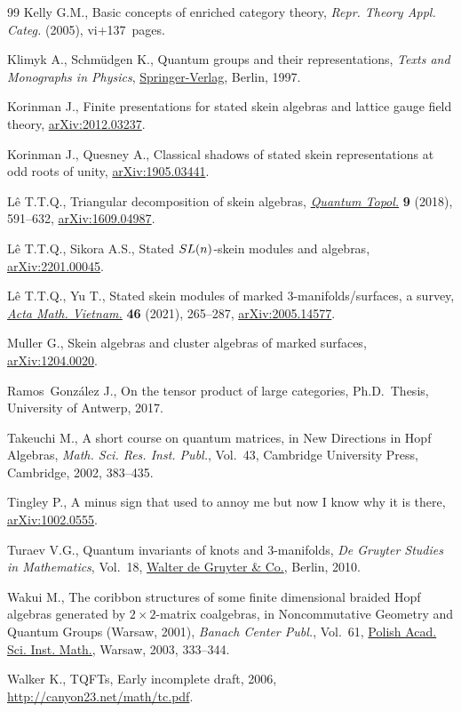 \documentclass[11pt]{article}
\numberwithin{equation}{section}
\numberwithin{equation}{section}
\begin{document}
\begin{thebibliography}{99}
Kelly G.M., Basic concepts of enriched category theory, \textit{Repr. Theory
 Appl. Categ.} (2005), vi+137~pages.

Klimyk A., Schm\"udgen K., Quantum groups and their representations, \textit{Texts and
 Monographs in Physics}, \href{https://doi.org/10.1007/978-3-642-60896-4}{Springer-Verlag}, Berlin, 1997.

Korinman J., Finite presentations for stated skein algebras and lattice gauge
 field theory, \href{http://arxiv.org/abs/2012.03237}{arXiv:2012.03237}.

Korinman J., Quesney A., Classical shadows of stated skein representations at
 odd roots of unity, \href{http://arxiv.org/abs/1905.03441}{arXiv:1905.03441}.

L\^e T.T.Q., Triangular decomposition of skein algebras, \href{https://doi.org/10.4171/QT/115}{\textit{Quantum
 Topol.}} \textbf{9} (2018), 591--632, \href{http://arxiv.org/abs/1609.04987}{arXiv:1609.04987}.

L\^e T.T.Q., Sikora A.S., Stated ${\rm SL}(n)$-skein modules and algebras,
 \href{http://arxiv.org/abs/2201.00045}{arXiv:2201.00045}.

L\^e T.T.Q., Yu T., Stated skein modules of marked 3-manifolds/surfaces, a
 survey, \href{https://doi.org/10.1007/s40306-021-00417-2}{\textit{Acta Math. Vietnam.}} \textbf{46} (2021), 265--287,
 \href{http://arxiv.org/abs/2005.14577}{arXiv:2005.14577}.

Muller G., Skein algebras and cluster algebras of marked surfaces,
 \href{http://arxiv.org/abs/1204.0020}{arXiv:1204.0020}.

Ramos~Gonz\'alez J., On the tensor product of large categories, Ph.D.~Thesis,
 {U}niversity of Antwerp, 2017.

Takeuchi M., A short course on quantum matrices, in New Directions in {H}opf
 Algebras, \textit{Math. Sci. Res. Inst. Publ.}, Vol.~43, Cambridge University
 Press, Cambridge, 2002, 383--435.

Tingley P., A minus sign that used to annoy me but now I know why it is there,
 \href{http://arxiv.org/abs/1002.0555}{arXiv:1002.0555}.

Turaev V.G., Quantum invariants of knots and 3-manifolds, \textit{De Gruyter
 Studies in Mathematics}, Vol.~18, \href{https://doi.org/10.1515/9783110221848}{Walter de Gruyter \& Co.}, Berlin, 2010.

Wakui M., The coribbon structures of some finite dimensional braided {H}opf
 algebras generated by {$2\times 2$}-matrix coalgebras, in Noncommutative
 Geometry and Quantum Groups ({W}arsaw, 2001), \textit{Banach Center Publ.},
 Vol.~61, \href{https://doi.org/10.4064/bc61-0-20}{Polish Acad. Sci. Inst. Math.}, Warsaw, 2003, 333--344.

Walker K., {TQFT}s, {E}arly incomplete draft, 2006,
 \url{http://canyon23.net/math/tc.pdf}.

\end{thebibliography}
\end{document}
